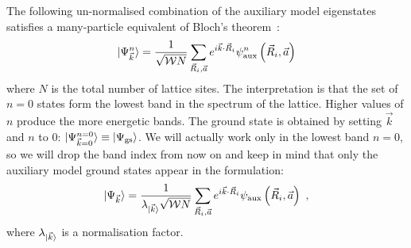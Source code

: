 \documentclass[prb]{revtex4-2}
\begin{document}
The following un-normalised combination of the auxiliary model eigenstates satisfies a many-particle equivalent of Bloch's theorem~\cite{stoyanova}:
\begin{equation}\begin{aligned}
	\ket{\Psi^n_{\vec k}} = \frac{1}{\sqrt{\mathcal{W} N}}\sum_{\vec R_i, \vec a} e^{i \vec{k}\cdot\vec{R}_i} \psi^n_\text{aux}\left(\vec R_i, \vec a\right)
\end{aligned}\end{equation}
where \(N\) is the total number of lattice sites. The interpretation is that the set of \(n=0\) states form the lowest band in the spectrum of the lattice. Higher values of \(n\) produce the more energetic bands. The ground state is obtained by setting \(\vec k\) and \(n\) to 0: \(\ket{\Psi_{\vec k=0}^{n=0}} \equiv \ket{\Psi_\text{gs}}\). We will actually work only in the lowest band \(n=0\), so we will drop the band index from now on and keep in mind that only the auxiliary model ground states appear in the formulation:
\begin{equation}\begin{aligned}
	\label{bloch-states}
	\ket{\Psi_{\vec k}} = \frac{1}{\lambda_{\ket{\vec k}} \sqrt{\mathcal{W} N}}\sum_{\vec R_i, \vec a} e^{i \vec{k}\cdot\vec{R}_i} \psi_\text{aux}\left(\vec R_i, \vec a\right)~,
\end{aligned}\end{equation}
where \(\lambda_{\ket{\vec k}}\) is a normalisation factor.
\end{document}
